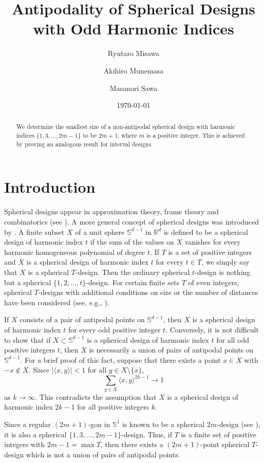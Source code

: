 \documentclass[11pt]{amsart}
\title{Antipodality of Spherical Designs with Odd Harmonic Indices}
\author{Ryutaro Misawa}
\author{Akihiro Munemasa}
\author{Masanori Sawa}
\date{\today}
\theoremstyle{definition}
\newcommand{\R}{\mathbb{R}}
\begin{document}
\begin{abstract}
We determine the smallest size of a non-antipodal spherical design with harmonic indices $\{1,3,\dots,2m-1\}$ to be $2m+1$, where $m$ is a positive integer. This is achieved by proving an analogous result for interval designs.
\end{abstract}

\maketitle
\section{Introduction}

Spherical designs appear in approximation theory, frame theory and combinatorics (see \cite{MRCHEN, MR485471, MR3752185}). A more general concept of spherical designs was introduced by \cite{MR3339051}. A finite subset $X$ of a unit sphere $\mathbb{S}^{d-1}$ in $\R^d$ is defined to be a spherical design of harmonic index $t$ if the sum of the values on $X$ vanishes for every harmonic homogeneous polynomial of degree $t$. If $T$ is a set of positive integers and $X$ is a spherical design of harmonic index $t$ for every $t\in T$, we simply say that $X$ is a spherical $T$-design. Then the ordinary spherical $t$-design is nothing but a spherical $\{1,2,\dots,t\}$-design. For certain finite sets $T$ of even integers, spherical $T$-designs with additional conditions on size or the number of distances have been considered (see, e.g., \cite{MR4662467,MR4080490,MR3434430,MR3650263}).

If $X$ consists of a pair of antipodal points on $\mathbb{S}^{d-1}$, then $X$ is a spherical design of harmonic index $t$ for every odd positive integer $t$. Conversely, it is not difficult to show that if \(X\subset\mathbb{S}^{d-1}\) is a spherical design of harmonic index $t$ for all odd positive integers $t$, then $X$ is necessarily a union of pairs of antipodal points on $\mathbb{S}^{d-1}$. 
For a brief proof of this
fact, suppose that there exists a point $x\in X$ with $-x\notin X$. 
Since $|\langle x,y\rangle|<1$ for all $y\in X\setminus\{x\}$,
\[
\sum_{y\in X}\langle x,y\rangle^{2k-1}\to 1
\]
as $k\to\infty$.
This contradicts the assumption %
 that $X$ is a spherical design of 
harmonic index $2k-1$ for all positive integers $k$.

Since a regular $(2m+1)$-gon in $\mathbb{S}^1$ is known to be a spherical $2m$-design (see \cite{MR679209}), it is also a spherical $\{1,3,\dots,2m-1\}$-design. Thus, if $T$ is a finite set of positive integers with $2m-1 =\max T$, then there exists a $(2m+1)$-point spherical $T$-design which is not a union of pairs of antipodal points.
\end{document}
